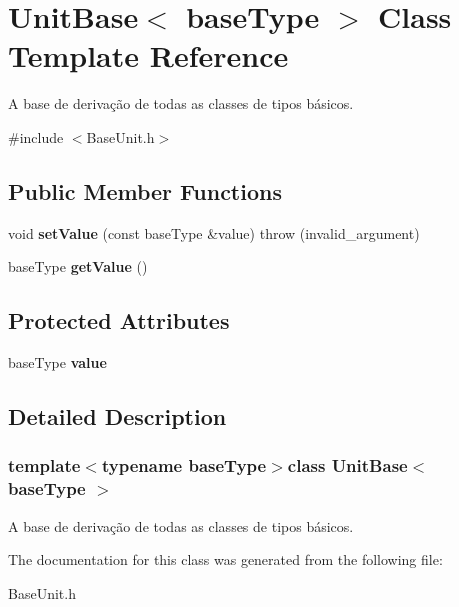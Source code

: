 \hypertarget{classUnitBase}{\section{Unit\-Base$<$ base\-Type $>$ Class Template Reference}
\label{classUnitBase}
}


A base de derivação de todas as classes de tipos básicos.  




{\ttfamily \#include $<$Base\-Unit.\-h$>$}

\subsection*{Public Member Functions}
\begin{DoxyCompactItemize}
\item 
\hypertarget{classUnitBase_af14e2453bc9870f0e04514799585e763}{void {\bfseries set\-Value} (const base\-Type \&value)  throw (invalid\-\_\-argument)}\label{classUnitBase_af14e2453bc9870f0e04514799585e763}

\item 
\hypertarget{classUnitBase_a620b2e9bda880c77d98a3c4cafb8443f}{base\-Type {\bfseries get\-Value} ()}\label{classUnitBase_a620b2e9bda880c77d98a3c4cafb8443f}

\end{DoxyCompactItemize}
\subsection*{Protected Attributes}
\begin{DoxyCompactItemize}
\item 
\hypertarget{classUnitBase_a1c1ad08b45f07a94e5cf71dee734436b}{base\-Type {\bfseries value}}\label{classUnitBase_a1c1ad08b45f07a94e5cf71dee734436b}

\end{DoxyCompactItemize}


\subsection{Detailed Description}
\subsubsection*{template$<$typename base\-Type$>$class Unit\-Base$<$ base\-Type $>$}

A base de derivação de todas as classes de tipos básicos. 

The documentation for this class was generated from the following file\-:\begin{DoxyCompactItemize}
\item 
Base\-Unit.\-h\end{DoxyCompactItemize}
